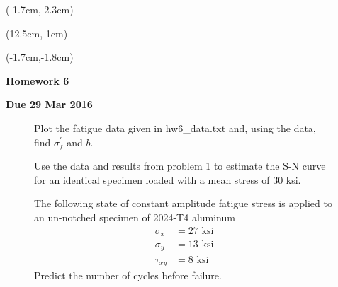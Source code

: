 \documentclass[12pt, oneside]{article}
\begin{document}


\begin{textblock*}{4cm}(-1.7cm,-2.3cm)
\end{textblock*}

\begin{textblock*}{8cm}(12.5cm,-1cm)
\end{textblock*}
\begin{textblock*}{13.5cm}(-1.7cm,-1.8cm)
\end{textblock*}

\vspace{1cm}

\begin{center}
\textbf{\Large Homework 6}

\textbf{Due 29 Mar 2016}
\end{center}

\begin{enumerate}

\begin{figure}[H]
	\item Plot the fatigue data given in hw6\_data.txt and, using the data, find $\sigma_f^\prime$ and $b$.
\end{figure}

\begin{figure}[H]
	\item Use the data and results from problem 1 to estimate the S-N curve for an identical specimen loaded with a mean stress of 30 ksi.
\end{figure}

\begin{figure}[H]
	\item The following state of constant amplitude fatigue stress is applied to an un-notched specimen of 2024-T4 aluminum
	\begin{align*}
	\sigma_x &= 27 \text{ ksi}\\
	\sigma_y &= 13 \text{ ksi}\\
	\tau_{xy} &= 8 \text{ ksi}
	\end{align*}
	Predict the number of cycles before failure.
\end{figure}



\end{enumerate}
\end{document}

